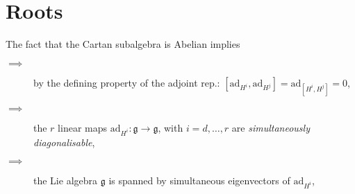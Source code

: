 \section{Roots}%
\label{sec:roots}

The fact that the Cartan subalgebra is Abelian implies
\begin{description}
  \item[$\implies$] by the defining property of the adjoint rep.: $ [\text{ad}_{H^{i}}, \text{ad}_{H^{j}}] = \text{ad}_{[H^{i}, H^{j}]} = 0 $,
  \item[$\implies$] the $r$ linear maps $\text{ad}_{H^{i}}\colon \mathfrak{g} \to \mathfrak{g}$, with $i = d, \dots, r$ are \emph{simultaneously diagonalisable},
  \item[$\implies$] the Lie algebra $\mathfrak{g}$ is spanned by simultaneous eigenvectors of $\text{ad}_{H^{i}}$,
\end{description}
